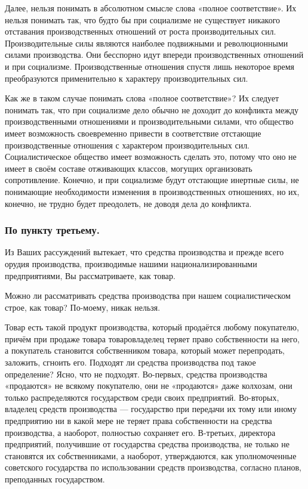 \documentclass[12pt, a4paper, openany]{book}
\begin{document}
Далее, нельзя понимать в абсолютном смысле слова «полное соответствие». Их нельзя понимать так, что будто бы при социализме не существует никакого отставания производственных отношений от роста производительных сил. Производительные силы являются наиболее подвижными и революционными силами производства. Они бесспорно идут впереди производственных отношений и при социализме. Производственные отношения спустя лишь некоторое время преобразуются применительно к характеру производительных сил.



Как же в таком случае понимать слова «полное соответствие»? Их следует понимать так, что при социализме дело обычно не доходит до конфликта между производственными отношениями и производительными силами, что общество имеет возможность своевременно привести в соответствие отстающие производственные отношения с характером производительных сил. Социалистическое общество имеет возможность сделать это, потому что оно не имеет в своём составе отживающих классов, могущих организовать сопротивление. Конечно, и при социализме будут отстающие инертные силы, не понимающие необходимости изменения в производственных отношениях, но их, конечно, не трудно будет преодолеть, не доводя дела до конфликта.



\subsubsection*{По пункту третьему.}





Из Ваших рассуждений вытекает, что средства производства и прежде всего орудия производства, производимые нашими национализированными предприятиями, Вы рассматриваете, как товар.



Можно ли рассматривать средства производства при нашем социалистическом строе, как товар? По-моему, никак нельзя.



Товар есть такой продукт производства, который продаётся любому покупателю, причём при продаже товара товаровладелец теряет право собственности на него, а покупатель становится собственником товара, который может перепродать, заложить, сгноить его. Подходят ли средства производства под такое определение? Ясно, что не подходят. Во-первых, средства производства «продаются» не всякому покупателю, они не «продаются» даже колхозам, они только распределяются государством среди своих предприятий. Во-вторых, владелец средств производства — государство при передачи их тому или иному предприятию ни в какой мере не теряет права собственности на средства производства, а наоборот, полностью сохраняет его. В-третьих, директора предприятий, получившие от государства средства производства, не только не становятся их собственниками, а наоборот, утверждаются, как уполномоченные советского государства по использовании средств производства, согласно планов, преподанных государством.
\end{document}
